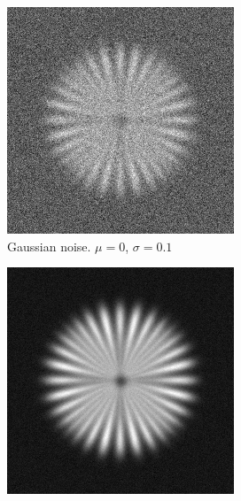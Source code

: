 \documentclass{./packages/optica-article}
\begin{document}
\begin{figure}[hbp]
\begin{center}
\begin{subfigure}[t]{0.25\textwidth}
			\includegraphics[width=\textwidth]{Simulation deconvolution/ref_ng_0.1}
			\caption{Gaussian noise. $\mu=0$, $\sigma=0.1$}\label{fig:sim:ng0.1}
		\end{subfigure}
		\quad
		\begin{subfigure}[t]{0.25\textwidth}\centering
			\centering
			\includegraphics[width=\textwidth]{Simulation deconvolution/ref_ng_0.01}

\end{subfigure}
\end{center}
\end{figure}
\end{document}
